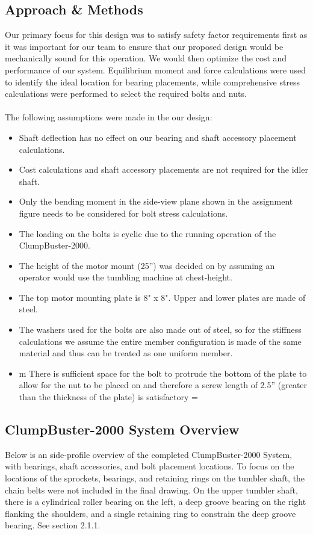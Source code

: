 \documentclass[letterpaper,12pt]{article}
\begin{document}
\subsection{Approach \& Methods}
Our primary focus for this design was to satisfy safety factor requirements first as it was important for our team to ensure that our proposed design would be mechanically sound for this operation. We would then optimize the cost and performance of our system. Equilibrium moment and force calculations were used to identify the ideal location for bearing placements, while comprehensive stress calculations were performed to select the required bolts and nuts.
\\\\
The following assumptions were made in the our design:
\begin{itemize}
    \itemsep0em
    \item Shaft deflection has no effect on our bearing and shaft accessory placement calculations.
    \item Cost calculations and shaft accessory placements are not required for the idler shaft.
    \item Only the bending moment in the side-view plane shown in the assignment figure needs to be considered for bolt stress calculations.
    \item The loading on the bolts is cyclic due to the running operation of the ClumpBuster-2000.
    \item The height of the motor mount (25'') was decided on by assuming an operator would use the tumbling machine at chest-height.
    \item The top motor mounting plate is 8" x 8". Upper and lower plates are made of steel.
    \item The washers used for the bolts are also made out of steel, so for the stiffness calculations we assume the entire member configuration is made of the same material and thus can be treated as one uniform member.
    \item m There is sufficient space for the bolt to protrude the bottom of the plate to allow for the nut to be placed on and therefore a screw length of 2.5” (greater than the thickness of the plate) is satisfactory =
\end{itemize}

\subsection{ClumpBuster-2000 System Overview}
Below is an side-profile overview of the completed ClumpBuster-2000 System, with bearings, shaft accessories, and bolt placement locations. To focus on the locations of the sprockets, bearings, and retaining rings on the tumbler shaft, the chain belts were not included in the final drawing. On the upper tumbler shaft, there is a cylindrical roller bearing on the left, a deep groove bearing on the right flanking the shoulders, and a single retaining ring to constrain the deep groove bearing. See section 2.1.1.
\end{document}
